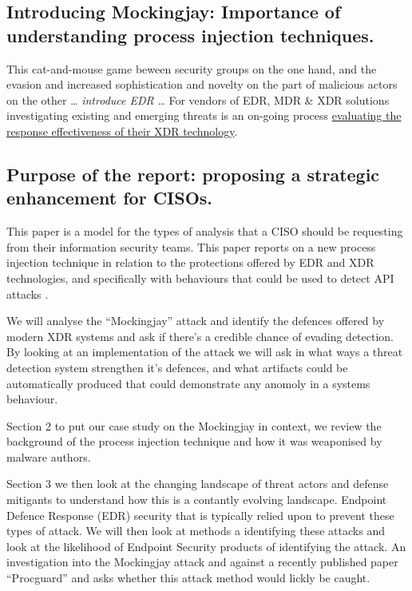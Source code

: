 \subsection{Introducing Mockingjay: Importance of understanding process injection techniques.}

This cat-and-mouse game beween security groups on the one hand, and the evasion and increased sophistication and novelty on the part of malicious actors on the other \ldots
\textit{introduce EDR} \ldots
For vendors of EDR, MDR \& XDR solutions investigating existing and emerging threats is an on-going process \href{https://research.tue.nl/files/305661196/Olteanu_I.C..pdf}{evaluating the response effectiveness of their XDR technology}.


\subsection{Purpose of the report: proposing a strategic enhancement for CISOs.}

This paper is a model for the types of analysis that a CISO should be requesting from their information security teams.  This paper reports on a new process injection technique \autocite{Peixoto:2023} in relation to the protections offered by EDR and XDR technologies, and specifically with behaviours that could be used to detect API attacks \autocite{Wang:2022}.

We will analyse the ``Mockingjay'' attack and identify the defences offered by modern XDR systems and ask if there's a credible chance of evading detection.  By looking at an implementation of the attack we will ask in what ways a threat detection system strengthen it's defences, and what artifacts could be automatically produced that could demonstrate any anomoly in a systems behaviour. 

Section 2 to put our case study on the Mockingjay in context, we review the background of the process injection technique and how it was weaponised by malware authors.

Section 3 we then look at the changing landscape of threat actors and defense mitigants to understand how this is a contantly evolving landscape.  Endpoint Defence Response (EDR) security that is typically relied upon to prevent these types of attack.  We will then look at methods a identifying these attacks and look at the likelihood of Endpoint Security products of identifying the attack.   An investigation into the Mockingjay attack and against a recently published paper ``Procguard'' \autocite{Wang:2022} and asks whether this attack method would lickly be caught.

